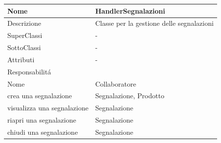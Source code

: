 \begin{center}
    \begin{tabular}{ |p{3cm}|p{3cm}|p{3cm}|p{3cm}| }
        \hline
        Nome & \multicolumn{3}{|p{9cm}|}{HandlerSegnalazioni} \\\hline
        Descrizione & \multicolumn{3}{|p{9cm}|}{Classe per la gestione delle segnalazioni} \\\hline
        SuperClassi & \multicolumn{3}{|p{9cm}|}{-} \\\hline
        SottoClassi & \multicolumn{3}{|p{9cm}|}{-} \\\hline
        Attributi & \multicolumn{3}{|p{9cm}|}{-} \\\hline
        \multicolumn{4}{|p{12cm}|}{Responsabilit\'a} \\\hline
        \multicolumn{2}{|p{6cm}|}{Nome} & \multicolumn{2}{|p{6cm}|}{Collaboratore} \\\hline
        \multicolumn{2}{|p{6cm}|}{crea una segnalazione} & \multicolumn{2}{|p{6cm}|}{Segnalazione, Prodotto} \\\hline
        \multicolumn{2}{|p{6cm}|}{visualizza una segnalazione} & \multicolumn{2}{|p{6cm}|}{Segnalazione} \\\hline
        \multicolumn{2}{|p{6cm}|}{riapri una segnalazione} & \multicolumn{2}{|p{6cm}|}{Segnalazione} \\\hline
        \multicolumn{2}{|p{6cm}|}{chiudi una segnalazione} & \multicolumn{2}{|p{6cm}|}{Segnalazione} \\\hline
    \end{tabular}
\end{center}




